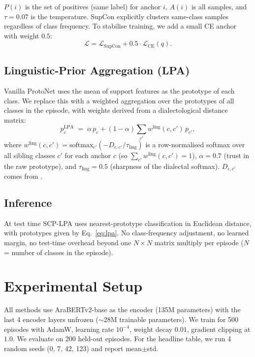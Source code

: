 \documentclass[11pt]{article}
\begin{document}
$P(i)$ is the set of positives (same label) for anchor $i$,
$A(i)$ is all samples, and $\tau{=}0.07$ is the temperature.
SupCon explicitly clusters same-class samples regardless of
class frequency. To stabilise training, we add a small CE
anchor with weight $0.5$:
\begin{equation}
\mathcal{L} = \mathcal{L}_{\text{SupCon}} + 0.5 \cdot \mathcal{L}_{\text{CE}}(q).
\label{eq:total}
\end{equation}

\subsection{Linguistic-Prior Aggregation (LPA)}
\label{sec:lpa}
Vanilla ProtoNet uses the mean of support features as the
prototype of each class. We replace this with a weighted
aggregation over the prototypes of all classes in the episode,
with weights derived from a dialectological distance matrix:
\begin{equation}
p_c^{\text{LPA}} \;=\; \alpha\, p_c + (1-\alpha) \sum_{c'} w^{\text{ling}}(c, c')\, p_{c'},
\label{eq:lpa}
\end{equation}
where $w^{\text{ling}}(c, c') = \mathrm{softmax}_{c'}(-D_{c,c'}/\tau_{\text{ling}})$
is a row-normalised softmax over all sibling classes $c'$ for
each anchor $c$ (so $\sum_{c'} w^{\text{ling}}(c, c') = 1$),
$\alpha=0.7$ (trust in the raw prototype), and
$\tau_{\text{ling}}=0.5$ (sharpness of the dialectal softmax).
$D_{c,c'}$ comes from \citet{Versteegh2006,Habash2010}.

\subsection{Inference}
\label{sec:inference}
At test time SCP-LPA uses nearest-prototype classification in
Euclidean distance, with prototypes given by Eq.~\ref{eq:lpa}.
No class-frequency adjustment, no learned margin, no test-time
overhead beyond one $N{\times}N$ matrix multiply per episode
($N$ = number of classes in the episode).

\section{Experimental Setup}
\label{sec:exp}

All methods use AraBERTv2-base \citep{Antoun2020} as the encoder
(135M parameters) with the last 4 encoder layers unfrozen
($\sim$28M trainable parameters). We train for 500 episodes with
AdamW, learning rate $10^{-4}$, weight decay $0.01$, gradient
clipping at $1.0$. We evaluate on 200 held-out episodes. For
the headline table, we run 4 random seeds (0, 7, 42, 123) and
report mean$\pm$std.
\end{document}
